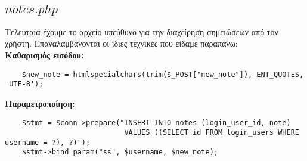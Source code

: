\documentclass{report}
\begin{document}
\subsection*{$notes.php$}
Τελευταία έχουμε το αρχείο υπεύθυνο για την διαχείρηση σημειώσεων από τον χρήστη. Επαναλαμβάνονται 
οι ίδιες τεχνικές που είδαμε παραπάνω:\\
\textbf{Καθαρισμός εισόδου:}
\begin{verbatim}
    $new_note = htmlspecialchars(trim($_POST["new_note"]), ENT_QUOTES, 'UTF-8');
\end{verbatim}
\textbf{Παραμετροποίηση:}
\begin{verbatim}
    $stmt = $conn->prepare("INSERT INTO notes (login_user_id, note) 
                            VALUES ((SELECT id FROM login_users WHERE username = ?), ?)");
    $stmt->bind_param("ss", $username, $new_note);
\end{verbatim}
\end{document}
